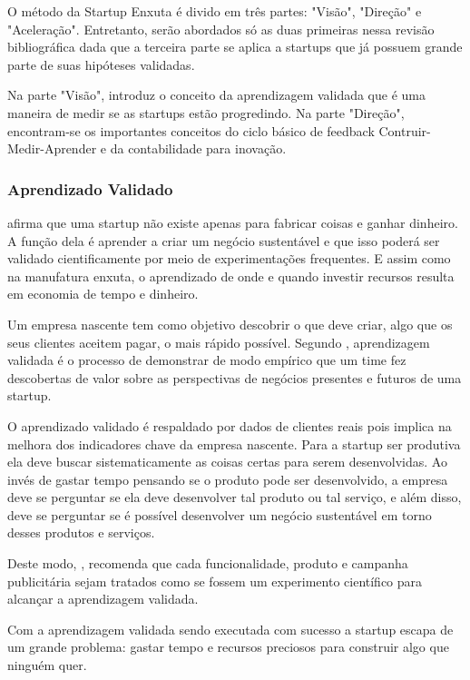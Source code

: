 O método da Startup Enxuta é divido em três partes: "Visão", "Direção" e "Aceleração". Entretanto, serão abordados só as duas primeiras nessa revisão bibliográfica dada que a terceira parte se aplica a startups que já possuem grande parte de suas hipóteses validadas.

Na parte "Visão",  introduz o conceito da aprendizagem validada que é uma maneira de medir se as startups estão progredindo. Na parte "Direção", encontram-se os importantes conceitos do ciclo básico de feedback Contruir-Medir-Aprender e da contabilidade para inovação.


\subsubsection{Aprendizado Validado}
\label{cha:apredizado_validado}
 afirma que uma startup não existe apenas para fabricar coisas e ganhar dinheiro. A função dela é aprender a criar um negócio sustentável e que isso poderá ser validado cientificamente por meio de experimentações frequentes. E assim como na manufatura enxuta, o aprendizado de onde e quando investir recursos resulta em economia de tempo e dinheiro.

Um empresa nascente tem como objetivo descobrir o que deve criar, algo que os seus clientes aceitem pagar, o mais rápido possível. Segundo , aprendizagem validada é o processo de demonstrar de modo empírico que um time fez descobertas de valor sobre as perspectivas de negócios presentes e futuros de uma startup.

O aprendizado validado é respaldado por dados de clientes reais pois implica na melhora dos indicadores chave da empresa nascente. Para a startup ser produtiva ela deve buscar sistematicamente as coisas certas para serem desenvolvidas. Ao invés de gastar tempo pensando se o produto pode ser desenvolvido, a empresa deve se perguntar se ela deve desenvolver tal produto ou tal serviço, e além disso, deve se perguntar se é possível desenvolver um negócio sustentável em torno desses produtos e serviços. \cite{leanstartup}

Deste modo, , recomenda que cada funcionalidade, produto e campanha publicitária sejam tratados como se fossem um experimento científico para alcançar a aprendizagem validada.

Com a aprendizagem validada sendo executada com sucesso a startup escapa de um grande problema: gastar tempo e recursos preciosos para construir algo que ninguém quer.


